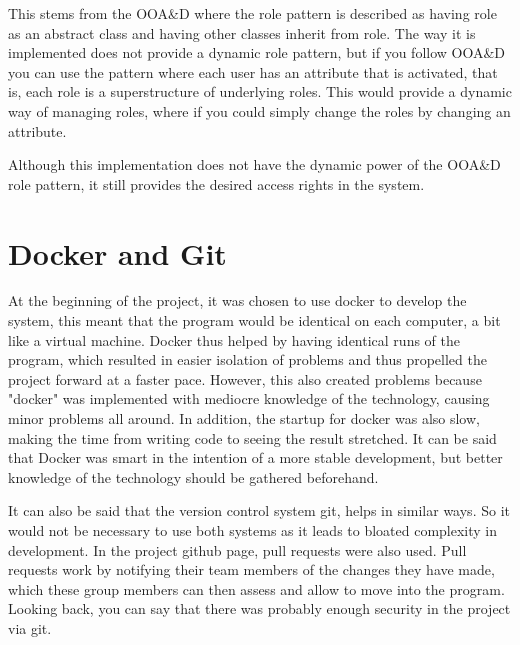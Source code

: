 This stems from the OOA\&D where the role pattern is described as having role as an abstract class and having other classes inherit from role.
The way it is implemented does not provide a dynamic role pattern, but if you follow OOA\&D you can use the pattern where each user has an attribute that is activated, that is, each role is a superstructure of underlying roles.
This would provide a dynamic way of managing roles, where if you could simply change the roles by changing an attribute.

Although this implementation does not have the dynamic power of the OOA\&D role pattern, it still provides the desired access rights in the system.

\section{Docker and Git}
At the beginning of the project, it was chosen to use docker to develop the system, this meant that the program would be identical on each computer, a bit like a virtual machine.
Docker thus helped by having identical runs of the program, which resulted in easier isolation of problems and thus propelled the project forward at a faster pace.
However, this also created problems because "docker" was implemented with mediocre knowledge of the technology, causing minor problems all around.
In addition, the startup for docker was also slow, making the time from writing code to seeing the result stretched.
It can be said that Docker was smart in the intention of a more stable development, but better knowledge of the technology should be gathered beforehand.

It can also be said that the version control system git, helps in similar ways.
So it would not be necessary to use both systems as it leads to bloated complexity in development.
In the project github page, pull requests were also used.
Pull requests work by notifying their team members of the changes they have made, which these group members can then assess and allow to move into the program.
Looking back, you can say that there was probably enough security in the project via git.

